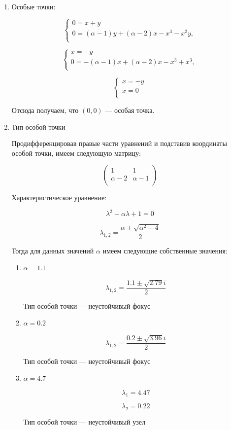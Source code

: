 \documentclass[12pt,a4paper]{article}
\begin{document}
\begin{enumerate}
\item Особые точки:

$$
\left\{
\begin{array}{lcl}
0 = x + y\\
0 = (\alpha - 1) y + (\alpha - 2) x - x^3 - x^2 y,\\
\end{array}
\right.
$$

$$
\left\{
\begin{array}{lcl}
x = - y\\
0 = - (\alpha - 1) x + (\alpha - 2) x - x^3 + x^3,\\
\end{array}
\right.
$$

$$
\left\{
\begin{array}{lcl}
x = -y\\
x = 0\\
\end{array}
\right.
$$

Отсюда получаем, что $(0, 0)$ --- особая точка.

\item Тип особой точки

Продифференцировав правые части уравнений и подставив координаты особой точки, имеем следующую матрицу:

$$\begin{pmatrix}
1 & 1\\
\alpha - 2 & \alpha - 1\\
\end{pmatrix}$$

Характеристическое уравнение:

$$
\lambda^2 - \alpha \lambda + 1 = 0
$$

$$
\lambda_{1, 2} = \frac{\alpha \pm \sqrt{\alpha^2 - 4}}{2}
$$

Тогда для данных значений $\alpha$ имеем следующие собственные значения:

\begin{enumerate}
\item $\alpha = 1.1$

$$\lambda_{1, 2} = \frac{1.1 \pm \sqrt{2.79} i}{2}$$

Тип особой точки --- неустойчивый фокус

\item $\alpha = 0.2$

$$\lambda_{1, 2} = \frac{0.2 \pm \sqrt{3.96} i}{2}$$

Тип особой точки --- неустойчивый фокус

\item $\alpha = 4.7$

$$
\lambda_1 = 4.47
$$

$$
\lambda_2 = 0.22
$$

Тип особой точки --- неустойчивый узел
\end{enumerate}
\end{enumerate}
\end{document}
